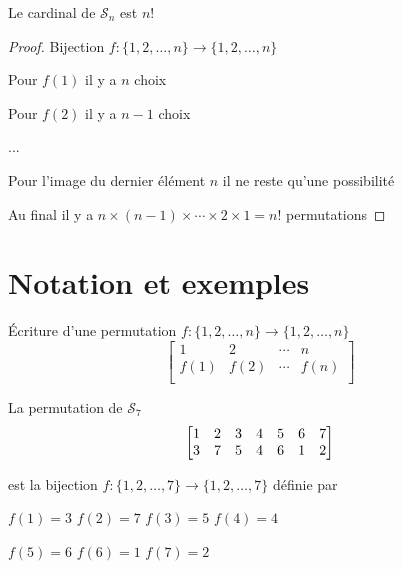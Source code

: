 \begin{frame}

\begin{lemme}
Le cardinal de $\mathcal{S}_n$ est $n!$
\end{lemme}

\pause
\bigskip

\begin{proof}

Bijection $f : \{1,2,\ldots,n\} \longrightarrow \{1,2,\ldots,n\}$

\medskip
 
Pour $f(1)$ il y a $n$ choix

Pour $f(2)$ il y a $n-1$ choix

...


Pour l'image du dernier élément $n$ il ne reste qu'une possibilité

Au final il y a $n\times(n-1)\times \cdots \times 2 \times 1 = n!$ permutations
\end{proof}

\end{frame}


\section{Notation et exemples}


\begin{frame}
\'Ecriture d'une permutation $f : \{1,2,\ldots,n\} \longrightarrow \{1,2,\ldots,n\}$
$$\left[\begin{matrix} 
 1    & 2    & \cdots & n \\  
 f(1) & f(2) & \cdots & f(n) \\      
        \end{matrix}
 \right]
$$

\pause
\bigskip

\begin{exemple}
La permutation de $\mathcal{S}_7$ 
$$\left[\begin{matrix} 
 1 & 2 & 3 & 4 & 5 & 6 & 7 \tikz[remember picture]\coordinate(extop); \\  
 3 & 7 & 5 & 4 & 6 & 1 & 2  \tikz[remember picture]\coordinate(exbot);\\      
        \end{matrix} \right]
$$  

\pause


\pause

est la bijection $f : \{1,2,\ldots,7\} \longrightarrow \{1,2,\ldots,7\}$
définie par 

\centerline{$f(1)= 3$ \quad  $f(2)=7$ \quad  $f(3)=5$ \quad $f(4)=4$}
\centerline{$f(5)=6$ \quad $f(6)=1$ \quad $f(7)=2$}
\end{exemple}

\end{frame}


